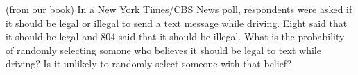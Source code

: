 \documentclass[addpoints]{exam}
\begin{document}
\begin{questions}

\question (from our book) In a New York Times/CBS News poll, respondents were asked if it should be legal or illegal to send a text message while driving. Eight said that it should be legal and 804 said that it should be illegal. What is the probability of randomly selecting somone who believes it should be legal to text while driving? Is it unlikely to randomly select someone with that belief?

\end{questions}
\end{document}
